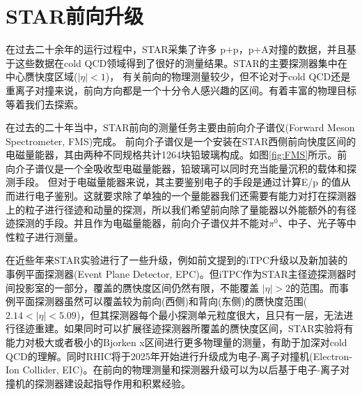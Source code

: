 \section{STAR前向升级}

在过去二十余年的运行过程中，STAR采集了许多 p+p，p+A对撞的数据，并且基于这些数据在cold QCD领域得到了很好的测量结果。STAR的主要探测器集中在中心赝快度区域($|\eta| < 1$)，
有关前向的物理测量较少，但不论对于cold QCD还是重离子对撞来说，前向方向都是一个十分令人感兴趣的区间。有着丰富的物理目标等着我们去探索。

在过去的二十年当中，STAR前向的测量任务主要由前向介子谱仪(Forward Meson Spectrometer, FMS)完成。
前向介子谱仪是一个安装在STAR西侧前向快度区间的电磁量能器，其由两种不同规格共计1264块铅玻璃构成。如图\ref{fig:FMS}所示。前向介子谱仪是一个全吸收型电磁量能器，铅玻璃可以同时充当能量沉积的载体和探测手段。
但对于电磁量能器来说，其主要鉴别电子的手段是通过计算E/p 的值从而进行电子鉴别。这就要求除了单独的一个量能器我们还需要有能力对打在探测器上的粒子进行径迹和动量的探测，所以我们希望前向除了量能器以外能额外的有径迹探测的手段。并且作为电磁量能器，前向介子谱仪并不能对$\pi^0$、中子、光子等中性粒子进行测量。

在近些年来STAR实验进行了一些升级，例如前文提到的iTPC升级以及新加装的事例平面探测器(Event Plane Detector, EPC)。但iTPC作为STAR主径迹探测器时间投影室的一部分，覆盖的赝快度区间仍然有限，不能覆盖 $|\eta| > 2$的范围。而事例平面探测器虽然可以覆盖较为前向(西侧)和背向(东侧)的赝快度范围($2.14 < |\eta| < 5.09 $)，但其探测器每个最小探测单元粒度很大，且只有一层，无法进行径迹重建。如果同时可以扩展径迹探测器所覆盖的赝快度区间，STAR实验将有能力对极大或者极小的Bjorken x区间进行更多物理量的测量，有助于加深对cold QCD的理解。同时RHIC将于2025年开始进行升级成为电子-离子对撞机(Electron-Ion Collider, EIC)。在前向的物理测量和探测器升级可以为以后基于电子-离子对撞机的探测器建设起指导作用和积累经验。

